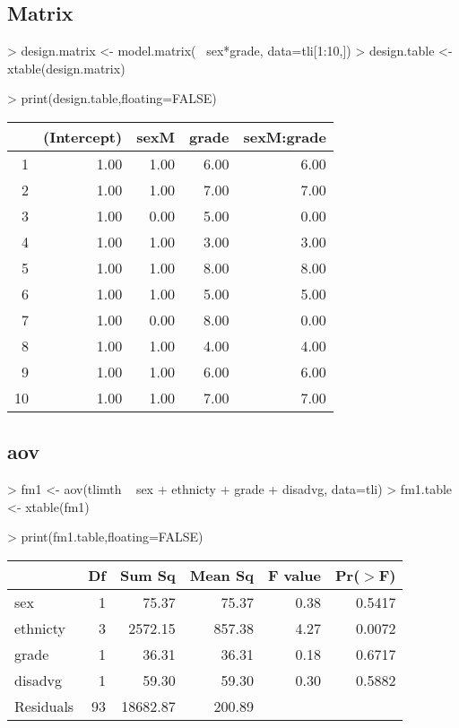 \documentclass[letterpaper]{article}
\begin{document}
\subsection{Matrix}
\begin{Schunk}
\begin{Sinput}
> design.matrix <- model.matrix(~ sex*grade, data=tli[1:10,])
> design.table <- xtable(design.matrix)
\end{Sinput}
\end{Schunk}
\begin{Schunk}
\begin{Sinput}
> print(design.table,floating=FALSE)
\end{Sinput}
% latex table generated in R 3.1.1 by xtable 1.7-3 package
% 
\begin{tabular}{rrrrr}
  \hline
 & (Intercept) & sexM & grade & sexM:grade \\ 
  \hline
1 & 1.00 & 1.00 & 6.00 & 6.00 \\ 
  2 & 1.00 & 1.00 & 7.00 & 7.00 \\ 
  3 & 1.00 & 0.00 & 5.00 & 0.00 \\ 
  4 & 1.00 & 1.00 & 3.00 & 3.00 \\ 
  5 & 1.00 & 1.00 & 8.00 & 8.00 \\ 
  6 & 1.00 & 1.00 & 5.00 & 5.00 \\ 
  7 & 1.00 & 0.00 & 8.00 & 0.00 \\ 
  8 & 1.00 & 1.00 & 4.00 & 4.00 \\ 
  9 & 1.00 & 1.00 & 6.00 & 6.00 \\ 
  10 & 1.00 & 1.00 & 7.00 & 7.00 \\ 
   \hline
\end{tabular}\end{Schunk}

\subsection{aov}
\begin{Schunk}
\begin{Sinput}
> fm1 <- aov(tlimth ~ sex + ethnicty + grade + disadvg, data=tli)
> fm1.table <- xtable(fm1)
\end{Sinput}
\end{Schunk}
\begin{Schunk}
\begin{Sinput}
> print(fm1.table,floating=FALSE)
\end{Sinput}
% latex table generated in R 3.1.1 by xtable 1.7-3 package
% 
\begin{tabular}{lrrrrr}
  \hline
 & Df & Sum Sq & Mean Sq & F value & Pr($>$F) \\ 
  \hline
sex & 1 & 75.37 & 75.37 & 0.38 & 0.5417 \\ 
  ethnicty & 3 & 2572.15 & 857.38 & 4.27 & 0.0072 \\ 
  grade & 1 & 36.31 & 36.31 & 0.18 & 0.6717 \\ 
  disadvg & 1 & 59.30 & 59.30 & 0.30 & 0.5882 \\ 
  Residuals & 93 & 18682.87 & 200.89 &  &  \\ 
   \hline
\end{tabular}\end{Schunk}
\end{document}

